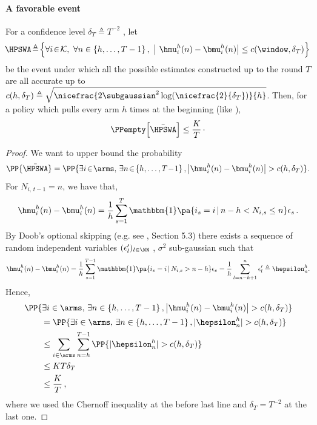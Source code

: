 \paragraph{A favorable event}\nopagebreak[4]
\begin{proposition}
\label{prop:prb_favorable_event_SWA}
For a confidence level $\delta_{T} \triangleq T^{-2}$
, let
\begin{equation}
\!\HPSWA \! \triangleq\! \Big\{\forall i\!\in\!\mathcal{K},\ \forall n\in \left\{h, \dots, T-1\right\}, \ \big| \ \hmu_i^h(n) - \bmu_i^h(n) \big| \leq c(\window, \delta_{T}) \Big\}
\label{eq:def_favorable_event_SWA}
\end{equation}
be the event under which all the possible estimates constructed up to the round $T$ are all accurate up to $c(h,\delta_{T}) \triangleq \sqrt{\nicefrac{2 \subgaussian^2\log(\nicefrac{2}{\delta_T})}{h}}$. Then, for a policy which pulls every arm $h$ times at the beginning (like \SWA),
\[
\PPempty\Big[\bar{\HPSWA}\Big] \leq\frac{K}{T}\,\cdot
\]
\end{proposition} 
%
\begin{proof}
We want to upper bound the probability
\[
\PP{\bar{\HPSWA}} = \PP{\exists i \!\in\! \arms,\,\exists n \!\in\! \left\{h, \dots, T\!-\!1\right\}, \big| \hmu_i^h(n) - \bmu_i^h(n)\big|>c(h,\delta_T) }.
\]
%
For $N_{i,\,t-1} = n$, we have that, 
\[
 \hmu_i^h(n) - \bmu_i^h(n)= \frac{1}{h} \sum_{s=1}^{T}\mathbbm{1}\pa{i_s = i \, |\, n -h < N_{i,s} \leq  n}\epsilon_s\,.
\]
By Doob's optional skipping (e.g. see \citet{chow1997probability}, Section 5.3) there exists a sequence of random independent variables $(\epsilon'_l)_{l\in\NN}$ , $\sigma^2$ sub-gaussian such that 
\[\hmu_i^h(n) - \bmu_i^h(n)= \frac{1}{h} \sum_{s=1}^{T-1}\mathbbm{1}\pa{i_s = i \, |\, N_{i,s}> n - h }\epsilon_s=  \frac{1}{h} \sum_{l=n-h+1}^n \epsilon'_l \triangleq \hepsilon^h_n. \]
%
Hence, 
\begin{align*}
    &\PP{\exists i \in \arms,\,\exists n \in \left\{h, \dots, T-1\right\}, \big| \hmu_i^h(n) - \bmu_i^h(n)\big|>c(h,\delta_T) }\\
    &\qquad= \PP{\exists i \in \arms,\,\exists n \in \left\{h, \dots, T-1\right\},|\hepsilon^h_n|>c(h,\delta_T) }\\
    &\qquad\leq \sum_{i \in \arms} \sum_{n=h}^{T-1} \PP{|\hepsilon^h_n|>c(h,\delta_T)} \\
    &\qquad\leq  KT \delta_T  \\
    &\qquad \leq \frac{K}{T}\,,
\end{align*}
where we used the Chernoff inequality at the before last line and $\delta_{T} = T^{-2}$ at the last one. 
\end{proof}
